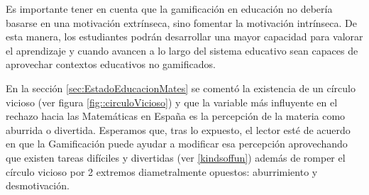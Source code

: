 Es importante tener en cuenta que la gamificación en educación no debería basarse en una motivación extrínseca, sino fomentar la motivación intrínseca. 
%
De esta manera, los estudiantes podrán desarrollar una mayor capacidad para valorar el aprendizaje y cuando avancen a lo largo del sistema educativo sean capaces de aprovechar contextos educativos no gamificados. 

En la sección \ref{sec:EstadoEducacionMates} se comentó la existencia de un círculo vicioso (ver figura \ref{fig::circuloVicioso}) y que la variable más influyente en el rechazo hacia las Matemáticas en España es la percepción de la materia como aburrida o divertida.
%
Esperamos que, tras lo expuesto, el lector esté de acuerdo en que la Gamificación puede ayudar a modificar esa percepción aprovechando que existen tareas difíciles y divertidas (ver \ref{kindsoffun}) además de romper el círculo vicioso por 2 extremos diametralmente opuestos: aburrimiento y desmotivación.


